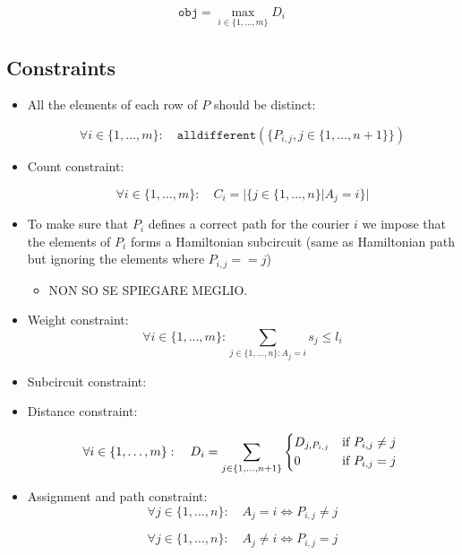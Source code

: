 \[ \texttt{obj} = \max_{i \in \{1, \dots, m\}} D_i  \]

\subsection{Constraints}

\begin{itemize}
    \item All the elements of each row of $P$ should be distinct:

    \begin{equation}
        \forall i \in \{1, \dots, m\}: \quad \texttt{alldifferent}(\{P_{i,j}, j \in \{1, \dots, n+1\}\}) 
    \end{equation}

    \item Count constraint: 

    \begin{equation}
        \forall i \in \{ 1, \dots, m \}: \quad C_i = | \{ j \in \{1, \dots, n\} | A_j = i \}|
    \end{equation}

    \item To make sure that $P_i$ defines a correct path for the courier $i$ we impose that the elements of $P_i$ forms a Hamiltonian subcircuit (same as Hamiltonian path but ignoring the elements where $P_{i,j} == j$)

    \begin{itemize}
        \item NON SO SE SPIEGARE MEGLIO.
    \end{itemize}

    \item Weight constraint: 
    \begin{equation}
        \forall i \in \{ 1, \dots, m \}: \sum_{j \in \{1, \dots, n\}: A_j = i} s_j \leq l_i 
    \end{equation}

    \item Subcircuit constraint:

    \item Distance constraint:

    \begin{equation}
        \forall i \in \{1, \dots, m\}: \quad D_i = \sum_{j \in \{1, \dots, n+1\}} \begin{cases*}
                    D_{j,P_{i,j}} & if  $P_{i,j} \neq j$  \\
                    0 & if $P_{i,j} = j$
                 \end{cases*}
    \end{equation}

    \item Assignment and path constraint:
    \begin{equation}
        \forall j \in \{1, \dots, n\}: \quad A_j = i \Longleftrightarrow P_{i,j} \neq j
    \end{equation}

    \begin{equation}
        \forall j \in \{1, \dots, n\}: \quad A_j \neq i \Longleftrightarrow P_{i,j} = j
    \end{equation}
\end{itemize}

